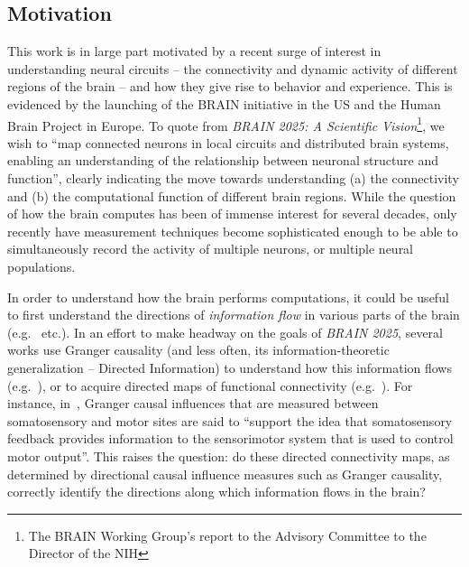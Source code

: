 \documentclass[letterpaper, 10pt, conference]{ieeeconf}
\begin{document}
\subsection{Motivation}
\label{sec:motivation}

This work is in large part motivated by a recent surge of interest in understanding neural circuits -- the connectivity and dynamic activity of different regions of the brain -- and how they give rise to behavior and experience. This is evidenced by the launching of the BRAIN initiative in the US and the Human Brain Project in Europe. To quote from \emph{BRAIN 2025: A Scientific Vision}\footnote{The BRAIN Working Group's report to the Advisory Committee to the Director of the NIH}, we wish to ``map connected neurons in local circuits and distributed brain systems, enabling an understanding of the relationship between neuronal structure and function'', clearly indicating the move towards understanding (a) the connectivity and (b) the computational function of different brain regions. While the question of how the brain computes has been of immense interest for several decades, only recently have measurement techniques become sophisticated enough to be able to simultaneously record the activity of multiple neurons, or multiple neural populations.

In order to understand how the brain performs computations, it could be useful to first understand the directions of \emph{information flow} in various parts of the brain (e.g.~\cite{blinowska2004granger, dhamala2008analyzing, nolte2008robustly, korzeniewska2003determination, schippers2010mapping} etc.). In an effort to make headway on the goals of \emph{BRAIN 2025}, several works use Granger causality (and less often, its information-theoretic generalization -- Directed Information) to understand how this information flows (e.g.~\cite{Brovelli2004BetaOscillations, goebel2003investigating, deshpande2008effective}), or to acquire directed maps of functional connectivity (e.g.~\cite{goebel2003investigating, deshpande2008effective, friston2013analysing}). For instance, in~\cite{Brovelli2004BetaOscillations}, Granger causal influences that are measured between somatosensory and motor sites are said to ``support the idea that somatosensory feedback provides information to the sensorimotor system that is used to control motor output''. This raises the question: do these directed connectivity maps, as determined by directional causal influence measures such as Granger causality, correctly identify the directions along which information flows in the brain?
\end{document}
